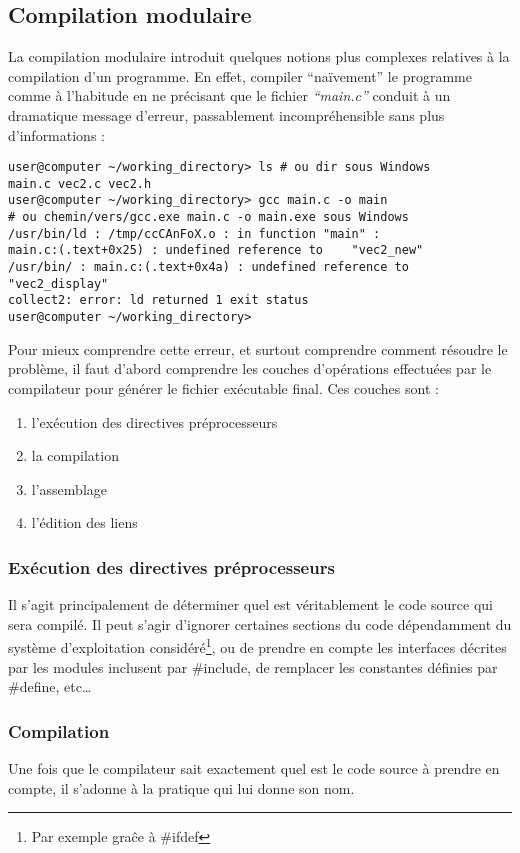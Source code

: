 \documentclass[../../../main.tex]{subfiles}
\begin{document}
\subsection{Compilation modulaire}
\label{sub:compilation_modulaire}
La compilation modulaire introduit quelques notions plus complexes relatives à la compilation d'un programme. En effet, compiler ``naïvement'' le programme comme à l'habitude en ne précisant que le fichier \textit{``main.c''} conduit à un dramatique message d'erreur, passablement incompréhensible sans plus d'informations :
\begin{verbatim}
user@computer ~/working_directory> ls # ou dir sous Windows
main.c vec2.c vec2.h
user@computer ~/working_directory> gcc main.c -o main
# ou chemin/vers/gcc.exe main.c -o main.exe sous Windows
/usr/bin/ld : /tmp/ccCAnFoX.o : in function "main" :
main.c:(.text+0x25) : undefined reference to	"vec2_new"
/usr/bin/ : main.c:(.text+0x4a) : undefined reference to "vec2_display"
collect2: error: ld returned 1 exit status
user@computer ~/working_directory>
\end{verbatim}
Pour mieux comprendre cette erreur, et surtout comprendre comment résoudre le problème, il faut d'abord comprendre les couches d'opérations effectuées par le compilateur pour générer le fichier exécutable final. Ces couches sont :
\begin{enumerate}
	\item l'exécution des directives préprocesseurs
	\item la compilation \cite{Aho}
	\item l'assemblage \cite{AL}
	\item l'édition des liens \cite{AL}\cite{LL}
\end{enumerate}
\subsubsection{Exécution des directives préprocesseurs}
\label{ssub:ex_cution_des_directives_pr_processeurs}
Il s'agit principalement de déterminer quel est véritablement le code source qui sera compilé. Il peut s'agir d'ignorer certaines sections du code dépendamment du système d'exploitation considéré\footnote{Par exemple graĉe à \#ifdef}, ou de prendre en compte les interfaces décrites par les modules inclusent par \textsf{\#include}, de remplacer les constantes définies par \textsf{\#define}, etc\dots
\subsubsection{Compilation}
\label{ssub:compilation}
Une fois que le compilateur sait exactement quel est le code source à prendre en compte, il s'adonne à la pratique qui lui donne son nom.
\end{document}
